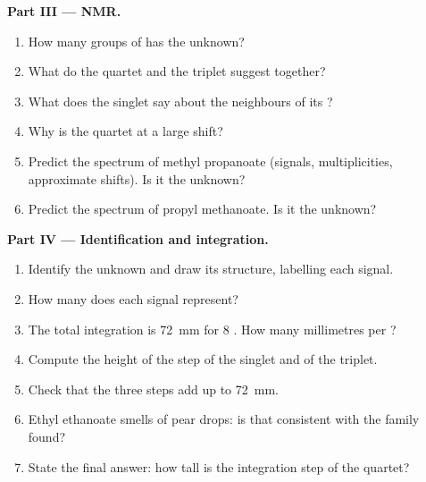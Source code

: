 \begin{problem}
\medskip
\noindent\textbf{Part III --- NMR.}
\begin{enumerate}[resume]
  \item How many groups of  has the unknown?
  \item What do the quartet and the triplet suggest together?
  \item What does the singlet say about the neighbours of its ?
  \item Why is the quartet at a large shift?
  \item Predict the spectrum of methyl propanoate 
        (signals, multiplicities, approximate shifts). Is it the unknown?
  \item Predict the spectrum of propyl methanoate. Is it the unknown?
\end{enumerate}

\medskip
\noindent\textbf{Part IV --- Identification and integration.}
\begin{enumerate}[resume]
  \item Identify the unknown and draw its structure, labelling each
        signal.
  \item How many  does each signal represent?
  \item The total integration is \qty{72}{mm} for 8 . How many
        millimetres per ?
  \item Compute the height of the step of the singlet and of the triplet.
  \item Check that the three steps add up to \qty{72}{mm}.
  \item Ethyl ethanoate smells of pear drops: is that consistent with the
        family found?
  \item State the final answer: how tall is the integration step of the
        quartet?
\end{enumerate}
\end{problem}
